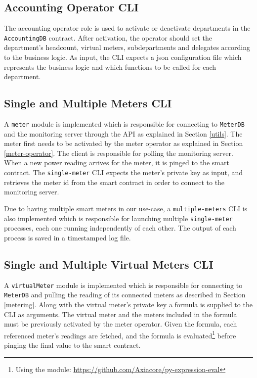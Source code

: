 \subsection{Accounting Operator CLI}
The accounting operator role is used to activate or deactivate departments in the \texttt{AccountingDB} contract. After activation, the operator should set the department's headcount, virtual meters, subdepartments and delegates according to the business logic. As input, the CLI expects a json configuration file which represents the business logic and which functions to be called for each department. 

\subsection{Single and Multiple Meters CLI}
A \texttt{meter} module is implemented which is responsible for connecting to \texttt{MeterDB} and the monitoring server through the API as explained in Section \ref{utils}. The meter first needs to be activated by the meter operator as explained in Section \ref{meter-operator}. The client is responsible for polling the monitoring server. When a new power reading arrives for the meter, it is pinged to the smart contract. The \texttt{single-meter} CLI expects the meter's private key as input, and retrieves the meter id from the smart contract in order to connect to the monitoring server.

Due to having multiple smart meters in our use-case, a \texttt{multiple-meters} CLI is also implemented which is responsible for launching multiple \texttt{single-meter} processes, each one running independently of each other. The output of each process is saved in a timestamped log file.

\subsection{Single and Multiple Virtual Meters CLI}
A \texttt{virtualMeter} module is implemented which is responsible for connecting to \texttt{MeterDB} and pulling the reading of its connected meters as described in Section \ref{metering}. Along with the virtual meter's private key a formula is supplied to the CLI as arguments. The virtual meter and the meters included in the formula must be previously activated by the meter operator. Given the formula, each referenced meter's readings are fetched, and the formula is evaluated\footnote{Using the module: \url{https://github.com/Axiacore/py-expression-eval}} before pinging the final value to the smart contract.


